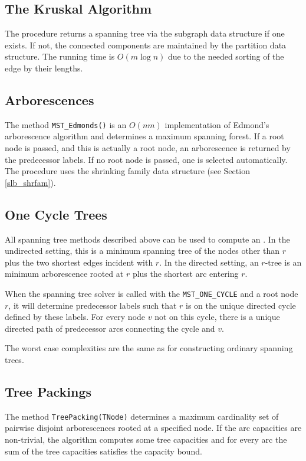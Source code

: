 \documentclass[a4paper,11pt,twoside]{book}
\begin{document}
\begin{multicols}{2}
\subsection{The Kruskal Algorithm}
The procedure returns a spanning tree via the subgraph data structure if one
exists. If not, the connected components are maintained by the partition data
structure. The running time is $O(m\log{n})$ due to the needed sorting of the
edge by their lengths.


\subsection{Arborescences}
The method \verb/MST_Edmonds()/ is an $O(nm)$ implementation of Edmond's
arborescence algorithm and determines a maximum spanning forest. If a root
node is passed, and this is actually a root node, an arborescence is returned
by the predecessor labels. If no root node is passed, one is selected
automatically. The procedure uses the shrinking family data structure
(see Section \ref{slb_shrfam}).


\subsection{One Cycle Trees}
\label{slb733}
All spanning tree methods described above can be used to compute an
. In the undirected setting, this is a minimum spanning tree of
the nodes other than $r$ plus the two shortest edges incident with $r$.
In the directed setting, an $r$-tree is an minimum arborescence rooted at
$r$ plus the shortest arc entering $r$.

When the spanning tree solver is called with the \verb/MST_ONE_CYCLE/ and a
root node $r$, it will determine predecessor labels such that $r$ is on the
unique directed cycle defined by these labels. For every node $v$ not on this
cycle, there is a unique directed path of predecessor arcs connecting the cycle
and $v$.

The worst case complexities are the same as for constructing ordinary spanning
trees.


\subsection{Tree Packings}
The method \verb/TreePacking(TNode)/ determines a maximum cardinality set of
pairwise disjoint arborescences rooted at a specified node. If the arc capacities
are non-trivial, the algorithm computes some tree capacities and for every arc
the sum of the tree capacities satisfies the capacity bound.


\end{multicols}
\end{document}
